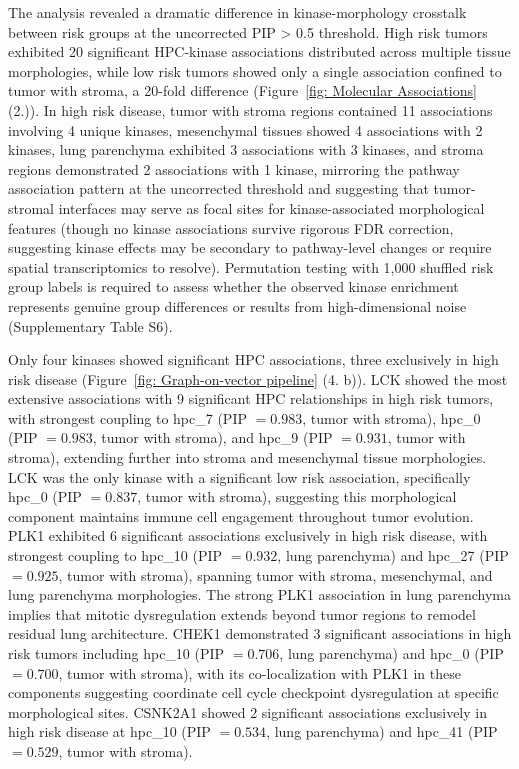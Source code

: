 \documentclass[pdflatex,article,12pt]{article}
\begin{document}
The analysis revealed a dramatic difference in kinase-morphology crosstalk between risk groups at the uncorrected PIP > 0.5 threshold. High risk tumors exhibited 20 significant HPC-kinase associations distributed across multiple tissue morphologies, while low risk tumors showed only a single association confined to tumor with stroma, a 20-fold difference (Figure~\ref{fig: Molecular Associations} (2.)). In high risk disease, tumor with stroma regions contained 11 associations involving 4 unique kinases, mesenchymal tissues showed 4 associations with 2 kinases, lung parenchyma exhibited 3 associations with 3 kinases, and stroma regions demonstrated 2 associations with 1 kinase, mirroring the pathway association pattern at the uncorrected threshold and suggesting that tumor-stromal interfaces may serve as focal sites for kinase-associated morphological features (though no kinase associations survive rigorous FDR correction, suggesting kinase effects may be secondary to pathway-level changes or require spatial transcriptomics to resolve). Permutation testing with 1,000 shuffled risk group labels is required to assess whether the observed kinase enrichment represents genuine group differences or results from high-dimensional noise (Supplementary Table S6).

Only four kinases showed significant HPC associations, three exclusively in high risk disease (Figure~\ref{fig: Graph-on-vector pipeline} (4. b)). LCK showed the most extensive associations with 9 significant HPC relationships in high risk tumors, with strongest coupling to hpc\_7 (PIP $= 0.983$, tumor with stroma), hpc\_0 (PIP $= 0.983$, tumor with stroma), and hpc\_9 (PIP $= 0.931$, tumor with stroma), extending further into stroma and mesenchymal tissue morphologies. LCK was the only kinase with a significant low risk association, specifically hpc\_0 (PIP $= 0.837$, tumor with stroma), suggesting this morphological component maintains immune cell engagement throughout tumor evolution. PLK1 exhibited 6 significant associations exclusively in high risk disease, with strongest coupling to hpc\_10 (PIP $= 0.932$, lung parenchyma) and hpc\_27 (PIP $= 0.925$, tumor with stroma), spanning tumor with stroma, mesenchymal, and lung parenchyma morphologies. The strong PLK1 association in lung parenchyma implies that mitotic dysregulation extends beyond tumor regions to remodel residual lung architecture. CHEK1 demonstrated 3 significant associations in high risk tumors including hpc\_10 (PIP $= 0.706$, lung parenchyma) and hpc\_0 (PIP $= 0.700$, tumor with stroma), with its co-localization with PLK1 in these components suggesting coordinate cell cycle checkpoint dysregulation at specific morphological sites. CSNK2A1 showed 2 significant associations exclusively in high risk disease at hpc\_10 (PIP $= 0.534$, lung parenchyma) and hpc\_41 (PIP $= 0.529$, tumor with stroma).
\end{document}
